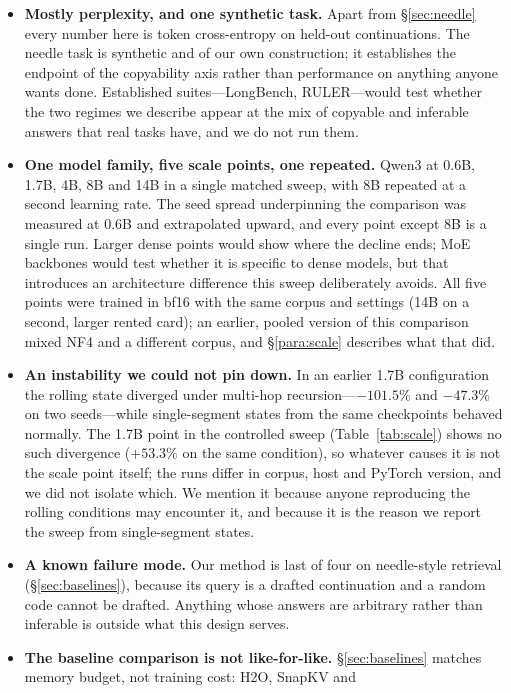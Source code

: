 \documentclass[11pt]{article}
\begin{document}
\begin{itemize}
\item \textbf{Mostly perplexity, and one synthetic task.} Apart from
\S\ref{sec:needle} every number here is token cross-entropy on held-out
continuations. The needle task is synthetic and of our own construction; it
establishes the endpoint of the copyability axis rather than performance on
anything anyone wants done. Established suites---LongBench, RULER---would test
whether the two regimes we describe appear at the mix of copyable and inferable
answers that real tasks have, and we do not run them.
\item \textbf{One model family, five scale points, one repeated.} Qwen3 at
0.6B, 1.7B, 4B, 8B and 14B in a single matched sweep, with 8B repeated at a
second learning rate. The seed spread underpinning the comparison was measured
at 0.6B and extrapolated upward, and every point except 8B is a single run.
Larger dense points would show where the decline ends; MoE backbones would test
whether it is specific to dense models, but that introduces an architecture
difference this sweep deliberately avoids.
All five points were trained in bf16 with the same corpus and settings (14B on
a second, larger rented card); an earlier, pooled version of this comparison mixed NF4 and a
different corpus, and \S\ref{para:scale} describes what that did.
\item \textbf{An instability we could not pin down.} In an earlier 1.7B
configuration the rolling state diverged under multi-hop recursion---$-101.5\%$
and $-47.3\%$ on two seeds---while single-segment states from the same
checkpoints behaved normally. The 1.7B point in the controlled sweep
(Table~\ref{tab:scale}) shows no such divergence ($+53.3\%$ on the same
condition), so whatever causes it is not the scale point itself; the runs differ
in corpus, host and PyTorch version, and we did not isolate which. We mention it
because anyone reproducing the rolling conditions may encounter it, and because
it is the reason we report the sweep from single-segment states.
\item \textbf{A known failure mode.} Our method is last of four on
needle-style retrieval (\S\ref{sec:baselines}), because its query is a drafted
continuation and a random code cannot be drafted. Anything whose answers are
arbitrary rather than inferable is outside what this design serves.
\item \textbf{The baseline comparison is not like-for-like.}
\S\ref{sec:baselines} matches memory budget, not training cost: H2O, SnapKV and

\end{itemize}
\end{document}

